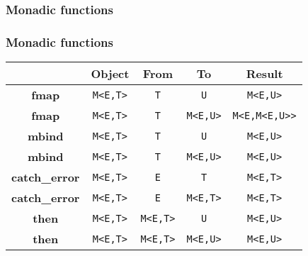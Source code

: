 \documentclass[xcolor=dvipsnames]{beamer}
\newcommand{\cpp}[1]{\lstinline{#1}}
\begin{document}
\subsubsection{Monadic functions}
\begin{frame}[fragile]
\frametitle{Monadic functions}


\begin{tabular}{|c|c|c|c|c|}
\hline
                    & Object & From & To & Result  \\
\hline
\textbf{fmap} & \cpp{M<E,T>} & \cpp{T} & \cpp{U} & \cpp{M<E,U>} \\
\hline
\textbf{fmap} & \cpp{M<E,T>} & \cpp{T} & \cpp{M<E,U>} & \cpp{M<E,M<E,U>>} \\
\hline
\textbf{mbind} & \cpp{M<E,T>} & \cpp{T} & \cpp{U} & \cpp{M<E,U>} \\
\hline
\textbf{mbind} & \cpp{M<E,T>} & \cpp{T} & \cpp{M<E,U>} & \cpp{M<E,U>} \\
\hline
\textbf{catch\_error} & \cpp{M<E,T>} & \cpp{E} & \cpp{T} & \cpp{M<E,T>} \\
\hline
\textbf{catch\_error} & \cpp{M<E,T>} & \cpp{E} & \cpp{M<E,T>} & \cpp{M<E,T>} \\
\hline
\textbf{then} & \cpp{M<E,T>} & \cpp{M<E,T>} & \cpp{U} & \cpp{M<E,U>} \\
\hline
\textbf{then} & \cpp{M<E,T>} & \cpp{M<E,T>} & \cpp{M<E,U>} & \cpp{M<E,U>} \\
\hline
\end{tabular}

\end{frame}
\end{document}
